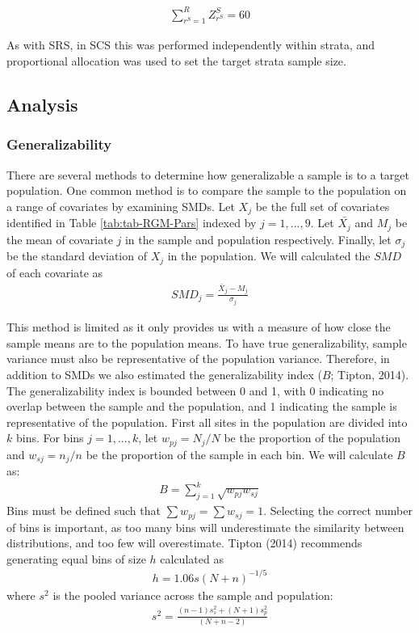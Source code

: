 \documentclass[man,floatsintext]{apa6}
\begin{document}
\begin{align} \label{eq:rankCS}
  \sum_{r^S=1}^R{Z^S_{r^S} = 60}
\end{align}

As with SRS, in SCS this was performed independently within strata, and proportional allocation was used to set the target strata sample size.

\hypertarget{analysis}{%
\subsection{Analysis}\label{analysis}}

\hypertarget{generalizability}{%
\subsubsection{Generalizability}\label{generalizability}}

There are several methods to determine how generalizable a sample is to a target population. One common method is to compare the sample to the population on a range of covariates by examining SMDs. Let \(X_j\) be the full set of covariates identified in Table \ref{tab:tab-RGM-Pars} indexed by \(j = 1,...,9\). Let \(\bar{X_j}\) and \(M_j\) be the mean of covariate \(j\) in the sample and population respectively. Finally, let \(\sigma_j\) be the standard deviation of \(X_j\) in the population. We will calculated the \(SMD\) of each covariate as
\begin{align}
  SMD_{j} = \frac{\bar{X}_{j}-M_{j}}{\sigma_{j}}
\end{align}

This method is limited as it only provides us with a measure of how close the sample means are to the population means. To have true generalizability, sample variance must also be representative of the population variance. Therefore, in addition to SMDs we also estimated the generalizability index (\(B\); Tipton, 2014). The generalizability index is bounded between 0 and 1, with 0 indicating no overlap between the sample and the population, and 1 indicating the sample is representative of the population. First all sites in the population are divided into \(k\) bins. For bins \(j = 1,...,k\), let \(w_{pj} = N_j/N\) be the proportion of the population and \(w_{sj} = n_j/n\) be the proportion of the sample in each bin. We will calculate \(B\) as:
\begin{align}
  B = \sum^k_{j=1}\sqrt{w_{pj}w_{sj}}
\end{align}
Bins must be defined such that \(\sum{w_{pj}} = \sum{w_{sj}} = 1\). Selecting the correct number of bins is important, as too many bins will underestimate the similarity between distributions, and too few will overestimate. Tipton (2014) recommends generating equal bins of size \(h\) calculated as
\begin{align}
  h = 1.06s(N+n)^{-1/5}
\end{align}
where \(s^2\) is the pooled variance across the sample and population:
\begin{align}
  s^2 = \frac{(n - 1)s^2_s + (N + 1)s^2_p}{(N + n - 2)}
\end{align}
\end{document}
